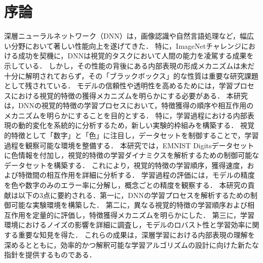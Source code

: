 \chapter{序論}
深層ニューラルネットワーク（DNN）は，画像認識や自然言語処理など，幅広い分野において著しい性能向上を遂げてきた．
特に，ImageNetチャレンジにおける成功を契機に，DNNは視覚的タスクにおいて人間の能力を凌駕する成果を示している\cite{ILSVRC15}．
しかし，その性能の背後にある内部表現の形成メカニズムは未だ十分に解明されておらず，その「ブラックボックス」的な性質は重要な研究課題として残されている．
モデルの信頼性や透明性を高めるためには，学習プロセスにおける視覚的特徴の獲得メカニズムを明らかにする必要がある．
本研究は，DNNの視覚的特徴の学習プロセスにおいて，特徴獲得の順序や相互作用のメカニズムを明らかにすることを目的とする．
特に，学習過程における内部表現の動的変化を系統的に分析するため，新しい実験的枠組みを構築する．
視覚的特徴として「数字」と「色」に注目し，データセットを制御することで，学習過程を観察可能な環境を整備する．
本研究では，EMNIST Digitsデータセットに色情報を付加し，視覚的特徴の学習ダイナミクスを解析するための制御可能なデータセットを構築する．
これにより，視覚的特徴の学習順序，獲得速度，および特徴間の相互作用を詳細に分析する．
学習過程の評価には，モデルの精度を色や数字のみのエラー率に分解し，概念ごとの精度を観察する．
本研究の貢献は以下の3点に要約される．第一に，DNNの学習プロセスを解析するための制御可能な実験環境を構築した．
第二に，異なる視覚的特徴の学習順序および相互作用を定量的に評価し，特徴獲得メカニズムを明らかにした．
第三に，学習環境におけるノイズの影響を詳細に調査し，モデルのロバスト性と学習効率に関する重要な知見を得た．
これらの成果は，深層学習における内部表現の理解を深めるとともに，効率的かつ解釈可能な学習アルゴリズムの設計に向けた新たな指針を提供するものである．

\newpage

